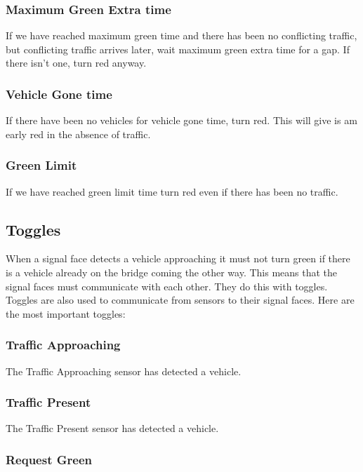 \documentclass[letterpaper,twoside]{article}
\begin{document}
\subsubsection{Maximum Green Extra time}
If we have reached maximum green time and there has been no conflicting
traffic, but conflicting traffic arrives later, wait maximum green extra time
for a gap.  If there isn't one, turn red anyway.

\subsubsection{Vehicle Gone time}
If there have been no vehicles for vehicle gone time, turn red.
This will give is am early red in the absence of traffic.

\subsubsection{Green Limit}
If we have reached green limit time turn red even if there has been no
traffic.

\subsection{Toggles}

When a signal face detects a vehicle approaching it must not turn green
if there is a vehicle already on the bridge coming the other way.
This means that the signal faces must communicate with each other.
They do this with toggles.  Toggles are also used to communicate
from sensors to their signal faces.  Here are the most important toggles:

\subsubsection{Traffic Approaching}

The Traffic Approaching sensor has detected a vehicle.

\subsubsection{Traffic Present}

The Traffic Present sensor has detected a vehicle.

\subsubsection{Request Green}
\end{document}
